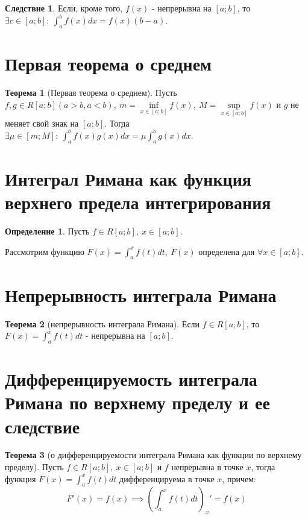 \documentclass{report}
\theoremstyle{definition}
\newtheorem*{definition}{Определение}
\newtheorem*{effect}{Следствие}
\newtheorem*{theorem}{Теорема}
\begin{document}
\begin{effect}
    Если, кроме того, $f(x)$ - непрерывна на $[a;b]$, то $\exists c \in [a;b]: \ \int_{a}^{b}f(x)dx =
        f(x)(b-a)$.
\end{effect}

\section{Первая теорема о среднем}

\begin{theorem}[Первая теорема о среднем]
    Пусть $f,g\in R[a;b] (a>b, a<b), \ m = \underset{x\in[a;b]}{\inf}f(x), \ M = \underset{x\in[a;b]}{\sup}f(x)$
    и $g$ не меняет свой знак на $[a;b]$. Тогда $\exists \mu \in [m;M]: \ \int_{a}^{b}f(x)g(x)dx = \mu \int_{a}^{b}
        g(x)dx$.
\end{theorem}

\section{Интеграл Римана как функция верхнего предела интегрирования}

\begin{definition}
    Пусть $f\in R[a;b], \ x \in [a;b]$.

    Рассмотрим функцию $F(x) = \int_{a}^{x}f(t)dt, \ F(x)$ определена для $\forall x \in [a;b]$.
\end{definition}

\section{Непрерывность интеграла Римана}

\begin{theorem}[непрерывность интеграла Римана]
    Если $f\in R[a;b]$, то $F(x) = \int_{a}^{x}f(t)dt$ - непрерывна на $[a;b]$.
\end{theorem}

\section{Дифференцируемость интеграла Римана по верхнему пределу и ее следствие}

\begin{theorem}[о дифференцируемости интеграла Римана как функции по верхнему пределу]
    Пусть $f\in R[a;b], \ x \in [a;b]$ и $f$ непрерывна в точке $x$, тогда функция $F(x) = \int_{a}^{x}f(t)dt$
    дифференцируема в точке $x$, причем:
    \begin{equation*}
        F'(x) = f(x) \implies (\int_{a}^{x}f(t)dt)_{x}'=f(x)
    \end{equation*}
\end{theorem}
\end{document}
